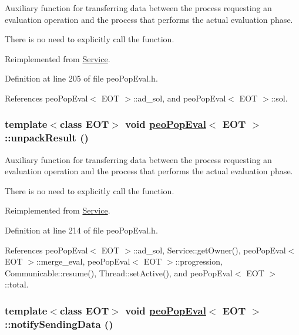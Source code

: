 Auxiliary function for transferring data between the process requesting an evaluation operation and the process that performs the actual evaluation phase. 

There is no need to explicitly call the function. 

Reimplemented from \hyperlink{classService_e5e4f90b2315e15c2a2913bd370f4cf5}{Service}.

Definition at line 205 of file peo\-Pop\-Eval.h.

References peo\-Pop\-Eval$<$ EOT $>$::ad\_\-sol, and peo\-Pop\-Eval$<$ EOT $>$::sol.\hypertarget{classpeoPopEval_f64aa1322e8e26f39143e1a6395206b6}{
\subsubsection[unpackResult]{\setlength{\rightskip}{0pt plus 5cm}template$<$class EOT$>$ void \hyperlink{classpeoPopEval}{peo\-Pop\-Eval}$<$ EOT $>$::unpack\-Result ()}}
\label{classpeoPopEval_f64aa1322e8e26f39143e1a6395206b6}


Auxiliary function for transferring data between the process requesting an evaluation operation and the process that performs the actual evaluation phase. 

There is no need to explicitly call the function. 

Reimplemented from \hyperlink{classService_45c06344edbfa482b91f68e2035a6099}{Service}.

Definition at line 214 of file peo\-Pop\-Eval.h.

References peo\-Pop\-Eval$<$ EOT $>$::ad\_\-sol, Service::get\-Owner(), peo\-Pop\-Eval$<$ EOT $>$::merge\_\-eval, peo\-Pop\-Eval$<$ EOT $>$::progression, Communicable::resume(), Thread::set\-Active(), and peo\-Pop\-Eval$<$ EOT $>$::total.\hypertarget{classpeoPopEval_9708f67fc813d397de3d13830ed09820}{
\subsubsection[notifySendingData]{\setlength{\rightskip}{0pt plus 5cm}template$<$class EOT$>$ void \hyperlink{classpeoPopEval}{peo\-Pop\-Eval}$<$ EOT $>$::notify\-Sending\-Data ()}}
\label{classpeoPopEval_9708f67fc813d397de3d13830ed09820}


